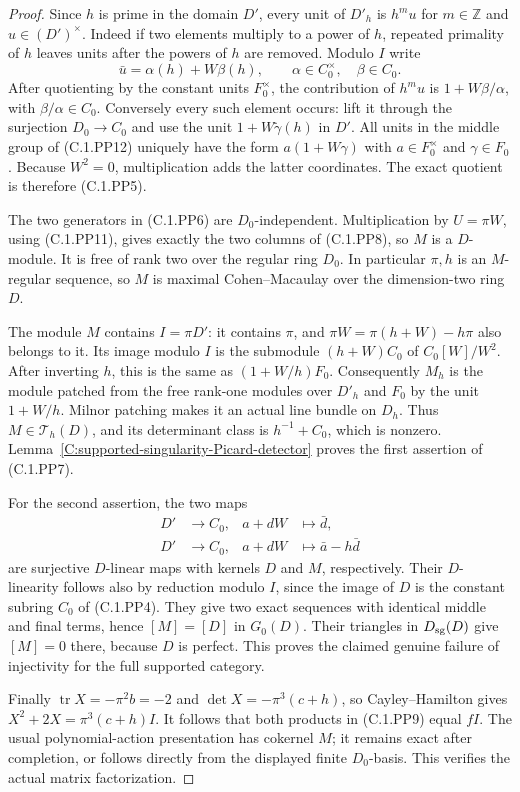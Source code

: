 \begin{proof}
Since $h$ is prime in the domain $D'$, every unit of $D'_h$
is $h^m u$ for $m\in\mathbb Z$ and $u\in(D')^\times$.
Indeed if two elements multiply to a power of $h$, repeated
primality of $h$ leaves units after the powers of $h$ are removed.
Modulo $I$ write
\[
             \bar u=\alpha(h)+W\beta(h),
 \qquad \alpha\in C_0^\times,
        \quad\beta\in C_0.
\]
After quotienting by the constant units $F_0^\times$,
the contribution of $h^m u$ is
$1+W\beta/\alpha$, with $\beta/\alpha\in C_0$.
Conversely every such element occurs: lift it through the
surjection $D_0\to C_0$ and use the unit
$1+W\widetilde\gamma(h)$ in $D'$.
All units in the middle group of (C.1.PP12) uniquely have the
form $a(1+W\gamma)$ with $a\in F_0^\times$ and
$\gamma\in F_0$.
Because $W^2=0$, multiplication adds the latter coordinates.
The exact quotient is therefore (C.1.PP5).

The two generators in (C.1.PP6) are $D_0$-independent.
Multiplication by $U=\pi W$, using (C.1.PP11), gives exactly
the two columns of (C.1.PP8), so $M$ is a $D$-module.
It is free of rank two over the regular ring $D_0$.
In particular $\pi,h$ is an $M$-regular sequence, so $M$ is
maximal Cohen--Macaulay over the dimension-two ring $D$.

The module $M$ contains $I=\pi D'$: it contains $\pi$, and
$\pi W=\pi(h+W)-h\pi$ also belongs to it.
Its image modulo $I$ is the submodule $(h+W)C_0$
of $C_0[W]/W^2$.
After inverting $h$, this is the same as
$(1+W/h)F_0$.
Consequently $M_h$ is the module patched from the free rank-one
modules over $D'_h$ and $F_0$ by the unit $1+W/h$.
Milnor patching makes it an actual line bundle on $D_h$.
Thus $M\in\mathcal T_h(D)$, and its determinant class is
$h^{-1}+C_0$, which is nonzero.
Lemma~\ref{C:supported-singularity-Picard-detector} proves the
first assertion of (C.1.PP7).

For the second assertion, the two maps
\[
 \begin{split}
 D'&\longrightarrow C_0,
             &a+dW&\longmapsto\bar d,\\
 D'&\longrightarrow C_0,
             &a+dW&\longmapsto\bar a-h\bar d
 \end{split}                                                   \tag{C.1.PP13}
\]
are surjective $D$-linear maps with kernels $D$ and $M$,
respectively.  Their $D$-linearity follows also by reduction
modulo $I$, since the image of $D$ is the constant subring
$C_0$ of (C.1.PP4).
They give two exact sequences with identical middle and final
terms, hence $[M]=[D]$ in $G_0(D)$.
Their triangles in $D_{\rm sg}(D)$ give $[M]=0$ there,
because $D$ is perfect.  This proves the claimed genuine
failure of injectivity for the full supported category.

Finally $\operatorname{tr}X=-\pi^2b=-2$ and
$\det X=-\pi^3(c+h)$, so Cayley--Hamilton gives
$X^2+2X=\pi^3(c+h)I$.
It follows that both products in (C.1.PP9) equal $fI$.
The usual polynomial-action presentation has cokernel $M$;
it remains exact after completion, or follows directly from
the displayed finite $D_0$-basis.
This verifies the actual matrix factorization.
\end{proof}

